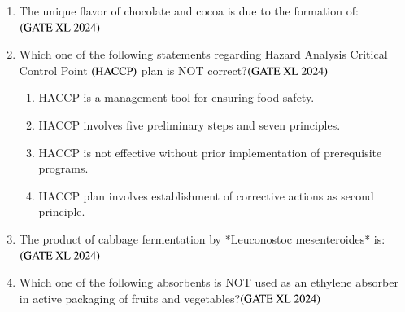 \documentclass[journal]{IEEEtran}
\begin{document}
\begin{enumerate}
    \item The unique flavor of chocolate and cocoa is due to the formation of:\hfill $\left(\text{GATE XL 2024}\right)$
    \begin{enumerate}
    \end{enumerate}

    \item Which one of the following statements regarding Hazard Analysis Critical Control Point $\left(\text{HACCP}\right)$ plan is NOT correct?\hfill $\left(\text{GATE XL 2024}\right)$
    \begin{enumerate}
        \item HACCP is a management tool for ensuring food safety.
        \item HACCP involves five preliminary steps and seven principles.
        \item HACCP is not effective without prior implementation of prerequisite programs.
        \item HACCP plan involves establishment of corrective actions as second principle.
    \end{enumerate}

    \item The product of cabbage fermentation by *Leuconostoc mesenteroides* is:\hfill $\left(\text{GATE XL 2024}\right)$
    \begin{enumerate}
    \end{enumerate}

    \item Which one of the following absorbents is NOT used as an ethylene absorber in active packaging of fruits and vegetables?\hfill $\left(\text{GATE XL 2024}\right)$
    \begin{enumerate}
    \end{enumerate}

\end{enumerate}
\end{document}
